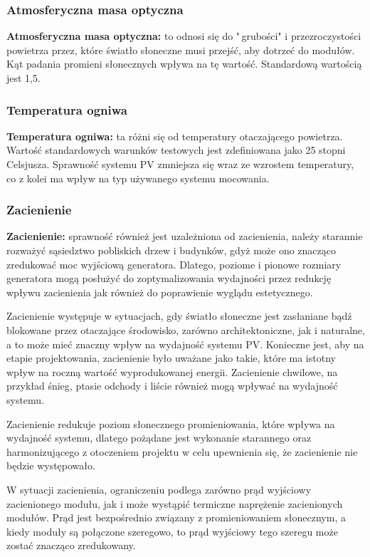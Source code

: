 \documentclass[12pt,a4paper]{article}
\begin{document}
\subsubsection{Atmosferyczna masa optyczna}
\textbf{Atmosferyczna masa optyczna:} to odnosi się do "\,grubości" i przezroczystości powietrza przez, które światło słoneczne musi przejść, aby dotrzeć do modułów. Kąt padania promieni słonecznych wpływa na tę wartość. Standardową wartością jest 1,5. 
\subsubsection{Temperatura ogniwa}
\textbf{Temperatura ogniwa:} ta różni się od temperatury otaczającego powietrza. Wartość standardowych warunków testowych jest zdefiniowana jako 25 stopni Celsjusza. Sprawność systemu PV zmniejsza się wraz ze wzrostem temperatury, co z kolei ma wpływ na typ używanego systemu mocowania. 
\subsubsection{Zacienienie}
\textbf{Zacienienie:} sprawność również jest uzależniona od zacienienia, należy starannie rozważyć sąsiedztwo pobliskich drzew i budynków, gdyż może ono znacząco zredukować moc wyjściową generatora. Dlatego, poziome i pionowe rozmiary generatora mogą posłużyć do zoptymalizowania wydajności przez redukcję wpływu zacienienia jak również do poprawienie wyglądu estetycznego. 

Zacienienie występuje w sytuacjach, gdy światło słoneczne jest 
zasłaniane bądź blokowane przez otaczające środowisko, zarówno 
architektoniczne, jak i naturalne, a to może mieć znaczny wpływ na 
wydajność systemu PV. Konieczne jest, aby na etapie projektowania, 
zacienienie było uważane jako takie, które ma istotny wpływ na roczną 
wartość wyprodukowanej energii. Zacienienie chwilowe, na przykład śnieg, 
ptasie odchody i liście również mogą wpływać na wydajność systemu. 

Zacienienie redukuje poziom słonecznego promieniowania, które wpływa na 
wydajność systemu, dlatego pożądane jest wykonanie starannego oraz 
harmonizującego z otoczeniem projektu w celu upewnienia się, że 
zacienienie nie będzie występowało. 

W sytuacji zacienienia, ograniczeniu podlega zarówno prąd wyjściowy 
zacienionego modułu, jak i może wystąpić termiczne naprężenie 
zacienionych modułów. Prąd jest bezpośrednio związany z 
promieniowaniem słonecznym, a kiedy moduły są połączone szeregowo, to 
prąd wyjściowy tego szeregu może zostać znacząco zredukowany. 
\end{document}
